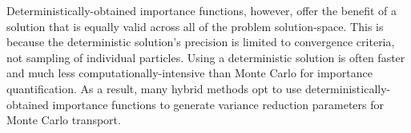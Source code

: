 Deterministically-obtained importance functions, however,
offer the benefit of a solution that is equally valid across all of the problem
solution-space. This is because the deterministic solution's precision is
limited to convergence criteria, not sampling of individual particles. Using a
deterministic solution is often faster and much less computationally-intensive
than Monte Carlo for importance quantification.
As a result, many hybrid methods opt
to use deterministically-obtained importance functions to generate variance
reduction parameters for Monte Carlo transport.
